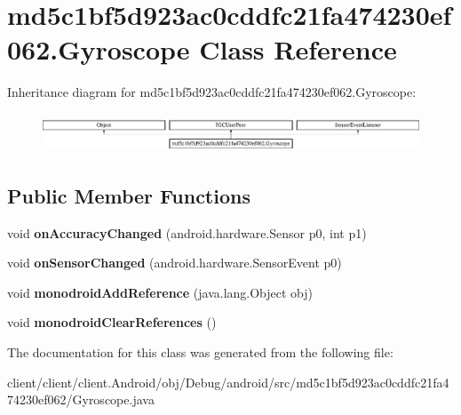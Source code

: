\hypertarget{classmd5c1bf5d923ac0cddfc21fa474230ef062_1_1Gyroscope}{}\section{md5c1bf5d923ac0cddfc21fa474230ef062.\+Gyroscope Class Reference}
\label{classmd5c1bf5d923ac0cddfc21fa474230ef062_1_1Gyroscope}
Inheritance diagram for md5c1bf5d923ac0cddfc21fa474230ef062.\+Gyroscope\+:\begin{figure}[H]
\begin{center}
\leavevmode
\includegraphics[height=1.163032cm]{classmd5c1bf5d923ac0cddfc21fa474230ef062_1_1Gyroscope}
\end{center}
\end{figure}
\subsection*{Public Member Functions}
\begin{DoxyCompactItemize}
\item 
\hypertarget{classmd5c1bf5d923ac0cddfc21fa474230ef062_1_1Gyroscope_a1b3b59a509b5b4a98613e9d605abb689}{}void {\bfseries on\+Accuracy\+Changed} (android.\+hardware.\+Sensor p0, int p1)\label{classmd5c1bf5d923ac0cddfc21fa474230ef062_1_1Gyroscope_a1b3b59a509b5b4a98613e9d605abb689}

\item 
\hypertarget{classmd5c1bf5d923ac0cddfc21fa474230ef062_1_1Gyroscope_ab90fb8e09b7e4def8128a309d16e001b}{}void {\bfseries on\+Sensor\+Changed} (android.\+hardware.\+Sensor\+Event p0)\label{classmd5c1bf5d923ac0cddfc21fa474230ef062_1_1Gyroscope_ab90fb8e09b7e4def8128a309d16e001b}

\item 
\hypertarget{classmd5c1bf5d923ac0cddfc21fa474230ef062_1_1Gyroscope_a4705226b408bd0ab6a0cf744e2fa1a03}{}void {\bfseries monodroid\+Add\+Reference} (java.\+lang.\+Object obj)\label{classmd5c1bf5d923ac0cddfc21fa474230ef062_1_1Gyroscope_a4705226b408bd0ab6a0cf744e2fa1a03}

\item 
\hypertarget{classmd5c1bf5d923ac0cddfc21fa474230ef062_1_1Gyroscope_aa7ea029a596152571597bdc6f1823539}{}void {\bfseries monodroid\+Clear\+References} ()\label{classmd5c1bf5d923ac0cddfc21fa474230ef062_1_1Gyroscope_aa7ea029a596152571597bdc6f1823539}

\end{DoxyCompactItemize}


The documentation for this class was generated from the following file\+:\begin{DoxyCompactItemize}
\item 
client/client/client.\+Android/obj/\+Debug/android/src/md5c1bf5d923ac0cddfc21fa474230ef062/Gyroscope.\+java\end{DoxyCompactItemize}

